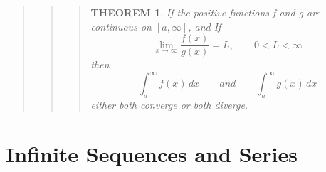 \documentclass{report}
\newtheorem{theorem}{THEOREM}
\begin{document}
\begin{quote}
\begin{quote}
\begin{quote}
			\begin{theorem}
				If the positive functions f and g are continuous on $\left [a,\infty \right ]$, and If
				$$\lim_{x\to \infty}\frac{f(x)}{g(x)} = L, \qquad 0<L<\infty$$
				then
				$$\int_{a}^{\infty}f(x)\,dx\qquad and\qquad \int_{a}^{\infty}g(x)\,dx$$
				either both converge or both diverge.
			\end{theorem}

		\end{quote}
	\end{quote}

\end{quote}


\setcounter{chapter}{9}
\chapter{Infinite Sequences and Series }

\end{document}
